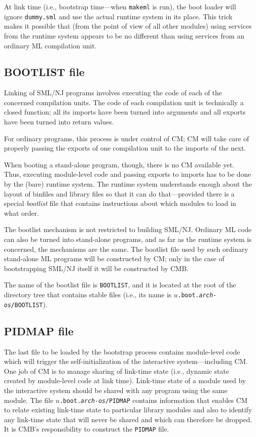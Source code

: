 At link time (i.e., bootstrap time---when {\tt makeml} is run), the
boot loader will ignore {\tt dummy.sml} and use the actual runtime
system in its place.  This trick makes it possible that (from the
point of view of all other modules) using services from the runtime
system appears to be no different than using services from an ordinary
ML compilation unit.

\subsection{BOOTLIST file}

Linking of SML/NJ programs involves executing the code of each of the
concerned compilation units.  The code of each compilation unit is
technically a closed function; all its imports have been turned into
arguments and all exports have been turned into return values.

For ordinary programs, this process is under control of CM; CM will
take care of properly passing the exports of one compilation unit to
the imports of the next.

When booting a stand-alone program, though, there is no CM available
yet.  Thus, executing module-level code and passing exports to imports
has to be done by the (bare) runtime system.  The runtime system
understands enough about the layout of binfiles and library files so
that it can do that---provided there is a special {\em bootlist}
file that contains instructions about which modules to load in what
order.

The bootlist mechanism is not restricted to building SML/NJ.  Ordinary
ML code can also be turned into stand-alone programs, and as far as the
runtime system is concerned, the mechanisms are the same.  The
bootlist file used by such ordinary stand-alone ML programs will be
constructed by CM; only in the case of bootstrapping SML/NJ itself it
will be constructed by CMB.

The name of the bootlist file is {\tt BOOTLIST}, and it is located at
the root of the directory tree that contains stable files (i.e., its
name is {\tt $u$.boot.{\it arch}-{\it os}/BOOTLIST}).

\subsection{PIDMAP file}

The last file to be loaded by the bootstrap process contains
module-level code which will trigger the self-initialization of the
interactive system---including CM.  One job of CM is to manage sharing
of link-time state (i.e., dynamic state created by module-level code
at link time).  Link-time state of a module used by the interactive
system should be shared with any program using the same module.  The
file {\tt $u$.boot.{\it arch}-{\it os}/PIDMAP} contains information
that enables CM to relate existing link-time state to particular
library modules and also to identify any link-time state that will
never be shared and which can therefore be dropped.  It is CMB's
responsibility to construct the {\tt PIDMAP} file.


